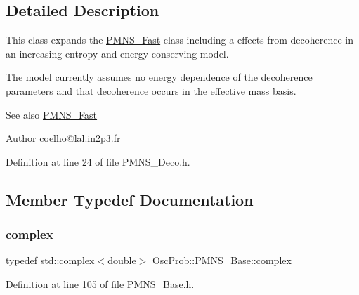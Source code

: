 \subsection{Detailed Description}
This class expands the \hyperlink{classOscProb_1_1PMNS__Fast}{P\+M\+N\+S\+\_\+\+Fast} class including a effects from decoherence in an increasing entropy and energy conserving model.

The model currently assumes no energy dependence of the decoherence parameters and that decoherence occurs in the effective mass basis.

\begin{DoxySeeAlso}{See also}
\hyperlink{classOscProb_1_1PMNS__Fast}{P\+M\+N\+S\+\_\+\+Fast}
\end{DoxySeeAlso}
\begin{DoxyAuthor}{Author}
coelho@lal.\+in2p3.\+fr 
\end{DoxyAuthor}


Definition at line 24 of file P\+M\+N\+S\+\_\+\+Deco.\+h.



\subsection{Member Typedef Documentation}
\mbox{\label{classOscProb_1_1PMNS__Base_ae86ec4718808ce9d02e5f5b4226714ab}} 
\subsubsection{\texorpdfstring{complex}{complex}}
{\footnotesize\ttfamily typedef std\+::complex$<$double$>$ \hyperlink{classOscProb_1_1PMNS__Base_ae86ec4718808ce9d02e5f5b4226714ab}{Osc\+Prob\+::\+P\+M\+N\+S\+\_\+\+Base\+::complex}\hspace{0.3cm}{\ttfamily [inherited]}}



Definition at line 105 of file P\+M\+N\+S\+\_\+\+Base.\+h.

\mbox{\label{classOscProb_1_1PMNS__Deco_a77b4e0c041b6268910a270be0f5387c9}} 
